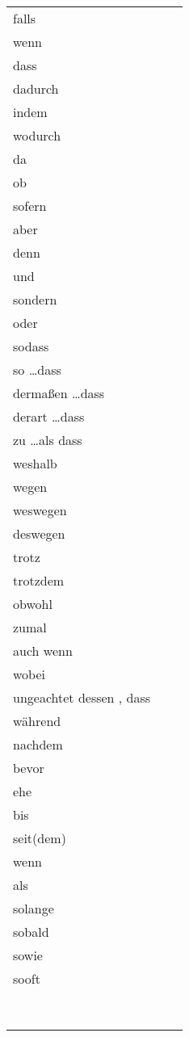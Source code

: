 \documentclass[a4paper,twocolumn,10pt]{article}
\newcommand{\tabularxtable}[3]
{

	\vspace{0.5cm}
	\nolinenumbers

	\begin{tabularx}{#1}{#2}
		#3
	\end{tabularx}

	\linenumbers
	\vspace{0.5cm}
}
\begin{document}


\tabularxtable
{0.99\linewidth}
{llX}
{

	falls   & \\
	wenn    & \\
	dass    & \\
	dadurch & \\
	indem   & \\
	wodurch & \\
	da      & \\
	ob    & \\
	sofern    & \\

	aber    & \\
	denn    & \\
	und    & \\
	sondern    & \\
	oder    & \\


	sodass    & \\
	so \ldots dass    & \\

	dermaßen \ldots dass    & \\
	derart \ldots dass    & \\
	zu \ldots als dass    & \\

	weshalb    & \\
	wegen    & \\
	weswegen    & \\
	deswegen    & \\

	trotz    & \\
	trotzdem    & \\



	obwohl    & \\
	zumal    & \\
	auch wenn    & \\
	wobei    & \\
	ungeachtet dessen , dass  & \\

	während    & \\
	nachdem    & \\
	bevor    & \\
	ehe   & \\
	bis    & \\
	seit(dem)    & \\
	wenn    & \\
	als    & \\
	solange    & \\
	sobald    & \\
	sowie    & \\
	sooft    & \\
	    & \\
	    & \\
	    & \\
	    & \\
	    & \\
	    & \\
	    & \\
	    & \\

}
\end{document}
